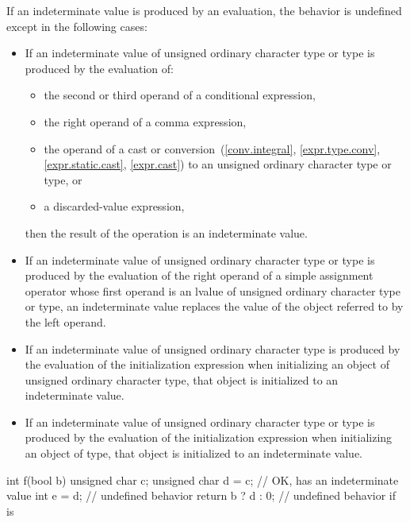 \pnum
If an indeterminate value is produced by an evaluation,
the behavior is undefined except in the following cases:
\begin{itemize}
\item
  If an indeterminate value of
  unsigned ordinary character type
  or  type
  is produced by the evaluation of:
  \begin{itemize}
  \item
    the second or third operand of a conditional expression,
  \item
    the right operand of a comma expression,
  \item
    the operand of a cast or conversion~(\ref{conv.integral},
    \ref{expr.type.conv}, \ref{expr.static.cast}, \ref{expr.cast})
    to an unsigned ordinary character type
    or  type, or
  \item
    a discarded-value expression,
  \end{itemize}
  then the result of the operation is an indeterminate value.
\item
  If an indeterminate value of
  unsigned ordinary character type or  type
  is produced by the evaluation of
  the right operand of a simple assignment operator
  whose first operand is an lvalue of
  unsigned ordinary character type or  type,
  an indeterminate value replaces
  the value of the object referred to by the left operand.
\item
  If an indeterminate value of unsigned ordinary character type
  is produced by the evaluation of the initialization expression
  when initializing an object of unsigned ordinary character type,
  that object is initialized to an indeterminate
  value.
\item
  If an indeterminate value of
  unsigned ordinary character type or  type
  is produced by the evaluation of the initialization expression
  when initializing an object of  type,
  that object is initialized to an indeterminate value.
\end{itemize}
\begin{example}
\begin{codeblock}
  int f(bool b) {
    unsigned char c;
    unsigned char d = c;        // OK,  has an indeterminate value
    int e = d;                  // undefined behavior
    return b ? d : 0;           // undefined behavior if  is 
  }
\end{codeblock}
\end{example}

